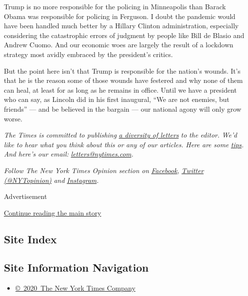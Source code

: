 Trump is no more responsible for the policing in Minneapolis than Barack
Obama was responsible for policing in Ferguson. I doubt the pandemic
would have been handled much better by a Hillary Clinton administration,
especially considering the catastrophic errors of judgment by people
like Bill de Blasio and Andrew Cuomo. And our economic woes are largely
the result of a lockdown strategy most avidly embraced by the
president's critics.

But the point here isn't that Trump is responsible for the nation's
wounds. It's that he is the reason some of those wounds have festered
and why none of them can heal, at least for as long as he remains in
office. Until we have a president who can say, as Lincoln did in his
first inaugural, ``We are not enemies, but friends'' --- and be believed
in the bargain --- our national agony will only grow worse.

\emph{The Times is committed to publishing}
\href{https://www.nytimes.com/2019/01/31/opinion/letters/letters-to-editor-new-york-times-women.html}{\emph{a
diversity of letters}} \emph{to the editor. We'd like to hear what you
think about this or any of our articles. Here are some}
\href{https://help.nytimes.com/hc/en-us/articles/115014925288-How-to-submit-a-letter-to-the-editor}{\emph{tips}}\emph{.
And here's our email:}
\href{mailto:letters@nytimes.com}{\emph{letters@nytimes.com}}\emph{.}

\emph{Follow The New York Times Opinion section on}
\href{https://www.facebook.com/nytopinion}{\emph{Facebook}}\emph{,}
\href{http://twitter.com/NYTOpinion}{\emph{Twitter (@NYTopinion)}}
\emph{and}
\href{https://www.instagram.com/nytopinion/}{\emph{Instagram}}\emph{.}

Advertisement

\protect\hyperlink{after-bottom}{Continue reading the main story}

\hypertarget{site-index}{%
\subsection{Site Index}\label{site-index}}

\hypertarget{site-information-navigation}{%
\subsection{Site Information
Navigation}\label{site-information-navigation}}

\begin{itemize}
\tightlist
\item
  \href{https://help.nytimes.com/hc/en-us/articles/115014792127-Copyright-notice}{©~2020~The
  New York Times Company}
\end{itemize}

